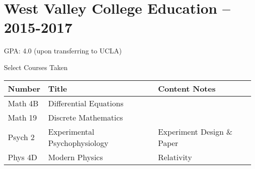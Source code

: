 \documentclass[11pt]{article}
\begin{document}
\newpage
\section{West Valley College Education -- 2015-2017}

GPA: 4.0 (upon transferring to UCLA)

Select Courses Taken

\begin{tabular}{l|l|l}
Number & Title & Content Notes \\
\hline
Math 4B & Differential Equations & \\
Math 19 & Discrete Mathematics & \\
Psych 2 & Experimental Psychophysiology & Experiment Design \& Paper \\
Phys 4D & Modern Physics & Relativity \\
\end{tabular}
\end{document}
